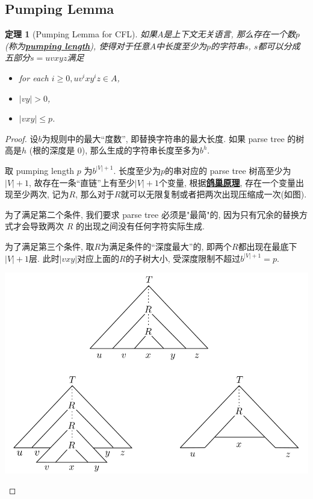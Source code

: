 \documentclass[8pt]{article}
\theoremstyle{compact}
\newtheorem{theorem}{定理}[section]
\def\obj#1{\textbf{\uline{#1}}}
\def\le{\leqslant}
\def\ge{\geqslant}
\begin{document}
\subsection{Pumping Lemma}

\begin{theorem}[Pumping Lemma for CFL]
	如果$A$是上下文无关语言, 那么存在一个数$p$(称为\obj{pumping length}), 使得对于任意$A$中长度至少为$p$的字符串$s$, $s$都可以分成五部分$s = uvxyz$满足
	\begin{itemize}
		\item for each $i \ge 0, uv^ixy^iz \in A$,
		\item $|vy| > 0$,
		\item $|vxy| \le p$.
	\end{itemize}
\end{theorem}
\begin{proof}
	设$b$为规则中的最大“度数”, 即替换字符串的最大长度. 如果 parse tree 的树高是$h$ (根的深度是 $0$), 那么生成的字符串长度至多为$b^h$. 

	取 pumping length $p$ 为$b^{|V|+1}$. 长度至少为$p$的串对应的 parse tree 树高至少为$|V| + 1$, 故存在一条“直链”上有至少$|V| + 1$个变量, 根据\obj{鸽巢原理}, 存在一个变量出现至少两次, 记为$R$, 那么对于$R$就可以无限复制或者把两次出现压缩成一次(如图). 

	为了满足第二个条件, 我们要求 parse tree 必须是"最简"的, 因为只有冗余的替换方式才会导致两次 $R$ 的出现之间没有任何字符实际生成.

	为了满足第三个条件, 取$R$为满足条件的“深度最大”的, 即两个$R$都出现在最底下$|V| + 1$层. 此时$|vxy|$对应上面的$R$的子树大小, 受深度限制不超过$b^{|V| + 1} = p$. 
	\begin{center}
		\includegraphics[scale=0.3]{pic/pumping_for_CFL.png}		
	\end{center}
\end{proof}
\end{document}
